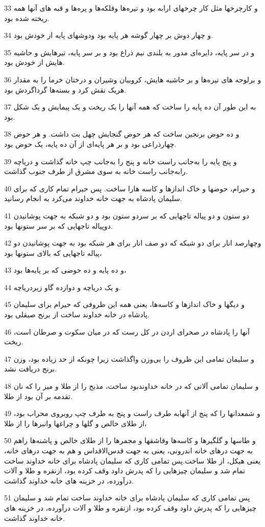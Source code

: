 \par 33 و کارچرخها مثل کار چرخهای ارابه بود و تیره‌ها وفلکه‌ها و پره‌ها و قبه های آنها همه ریخته شده بود.
\par 34 و چهار دوش بر چهار گوشه هر پایه بود ودوشهای پایه از خودش بود.
\par 35 و در سر پایه، دایره‌ای مدور به بلندی نیم ذراع بود و بر سر پایه، تیرهایش و حاشیه هایش از خودش بود.
\par 36 و برلوحه های تیره‌ها و بر حاشیه هایش، کروبیان وشیران و درختان خرما را به مقدار هریک نقش کرد و بسته‌ها گرداگردش بود.
\par 37 به این طور آن ده پایه را ساخت که همه آنها را یک ریخت و یک پیمایش و یک شکل بود.
\par 38 و ده حوض برنجین ساخت که هر حوض گنجایش چهل بت داشت. و هر حوض چهارذراعی بود و بر هر پایه‌ای از آن ده پایه، یک حوض بود.
\par 39 و پنج پایه را به‌جانب راست خانه و پنج را به‌جانب چپ خانه گذاشت و دریاچه رابه‌جانب راست خانه به سوی مشرق از طرف جنوب گذاشت.
\par 40 و حیرام، حوضها و خاک اندازها و کاسه هارا ساخت. پس حیرام تمام کاری که برای سلیمان پادشاه به جهت خانه خداوند می‌کرد به انجام رسانید.
\par 41 دو ستون و دو پیاله تاجهایی که بر سردو ستون بود و دو شبکه به جهت پوشانیدن دوپیاله تاجهایی که بر سر ستونها بود.
\par 42 وچهارصد انار برای دو شبکه که دو صف انار برای هر شبکه بود به جهت پوشانیدن دو پیاله تاجهایی که بالای ستونها بود،
\par 43 و ده پایه و ده حوضی که بر پایه‌ها بود،
\par 44 و یک دریاچه و دوازده گاو زیردریاچه.
\par 45 و دیگها و خاک اندازها و کاسه‌ها، یعنی همه این ظروفی که حیرام برای سلیمان پادشاه در خانه خداوند ساخت از برنج صیقلی بود.
\par 46 آنها را پادشاه در صحرای اردن در کل رست که در میان سکوت و صرطان است، ریخت.
\par 47 و سلیمان تمامی این ظروف را بی‌وزن واگذاشت زیرا چونکه از حد زیاده بود، وزن برنج دریافت نشد.
\par 48 و سلیمان تمامی آلاتی که در خانه خداوندبود ساخت، مذبح را از طلا و میز را که نان تقدمه بر آن بود از طلا.
\par 49 و شمعدانها را که پنج از آنهابه طرف راست و پنج به طرف چپ روبروی محراب بود، از طلای خالص و گلها و چراغها وانبرها را از طلا،
\par 50 و طاسها و گلگیرها و کاسه‌ها وقاشقها و مجمرها را از طلای خالص و پاشنه‌ها راهم به جهت درهای خانه اندرونی، یعنی به جهت قدس‌الاقداس و هم به جهت درهای خانه، یعنی هیکل، از طلا ساخت.پس تمامی کاری که سلیمان پادشاه برای خانه خداوند ساخت تمام شد و سلیمان چیزهایی را که پدرش داود وقف کرده بود، ازنقره و طلا و آلات درآورده، در خزینه های خانه خداوند گذاشت.
\par 51 پس تمامی کاری که سلیمان پادشاه برای خانه خداوند ساخت تمام شد و سلیمان چیزهایی را که پدرش داود وقف کرده بود، ازنقره و طلا و آلات درآورده، در خزینه های خانه خداوند گذاشت.
 
